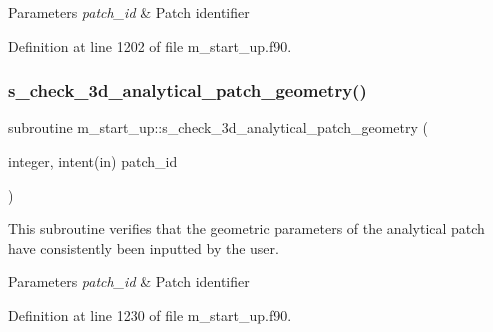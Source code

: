 \begin{DoxyParams}{Parameters}
{\em patch\+\_\+id} & Patch identifier \\
\hline
\end{DoxyParams}


Definition at line 1202 of file m\+\_\+start\+\_\+up.\+f90.

\mbox{\label{namespacem__start__up_a936948a39ac13e74203588cae06b325f}} 
\subsubsection{\texorpdfstring{s\+\_\+check\+\_\+3d\+\_\+analytical\+\_\+patch\+\_\+geometry()}{s\_check\_3d\_analytical\_patch\_geometry()}}
{\footnotesize\ttfamily subroutine m\+\_\+start\+\_\+up\+::s\+\_\+check\+\_\+3d\+\_\+analytical\+\_\+patch\+\_\+geometry (\begin{DoxyParamCaption}\item[{integer, intent(in)}]{patch\+\_\+id }\end{DoxyParamCaption})}



This subroutine verifies that the geometric parameters of the analytical patch have consistently been inputted by the user. 


\begin{DoxyParams}{Parameters}
{\em patch\+\_\+id} & Patch identifier \\
\hline
\end{DoxyParams}


Definition at line 1230 of file m\+\_\+start\+\_\+up.\+f90.

\mbox{\label{namespacem__start__up_ada150cf67ef5f91529ac7eda46ad5492}} 
